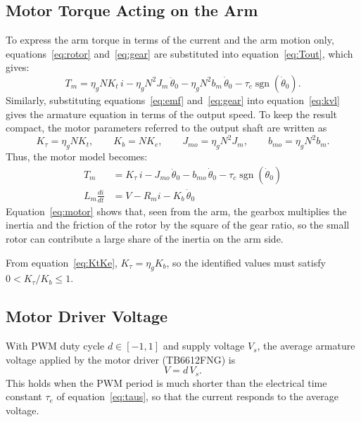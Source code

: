 \documentclass[a4paper,11pt]{article}
\newcommand{\sgn}{\operatorname{sgn}}
\begin{document}
\subsection{Motor Torque Acting on the Arm}
To express the arm torque in terms of the current and the arm motion only, equations~\ref{eq:rotor} and~\ref{eq:gear} are substituted into equation~\ref{eq:Tout}, which gives:
\begin{equation}
  T_m = \eta_g N K_t\, i - \eta_g N^2 J_m\, \ddot\theta_0 - \eta_g N^2 b_m\, \dot\theta_0 - \tau_c \sgn(\dot\theta_0) .
\end{equation}
Similarly, substituting equations~\ref{eq:emf} and~\ref{eq:gear} into equation~\ref{eq:kvl} gives the armature equation in terms of the output speed. To keep the result compact, the motor parameters referred to the output shaft are written as
\begin{equation}
  K_\tau = \eta_g N K_t, \qquad K_b = N K_e, \qquad J_{mo} = \eta_g N^2 J_m, \qquad b_{mo} = \eta_g N^2 b_m .
  \label{eq:outref}
\end{equation}
Thus, the motor model becomes:
\begin{equation}
\boxed{
\begin{aligned}
  T_m &= K_\tau\, i - J_{mo}\, \ddot\theta_0 - b_{mo}\, \dot\theta_0 - \tau_c \sgn(\dot\theta_0)\\
  L_m \frac{di}{dt} &= V - R_m i - K_b\, \dot\theta_0
\end{aligned}
}
\label{eq:motor}
\end{equation}
Equation~\ref{eq:motor} shows that, seen from the arm, the gearbox multiplies the inertia and the friction of the rotor by the square of the gear ratio, so the small rotor can contribute a large share of the inertia on the arm side.

From equation~\ref{eq:KtKe}, $K_\tau = \eta_g K_b$, so the identified values must satisfy $0 < K_\tau / K_b \le 1$.

\subsection{Motor Driver Voltage}
With PWM duty cycle $d \in [-1, 1]$ and supply voltage $V_s$, the average armature voltage applied by the motor driver (TB6612FNG) is
\begin{equation}
  V = d\, V_s .
  \label{eq:duty}
\end{equation}
This holds when the PWM period is much shorter than the electrical time constant $\tau_e$ of equation~\ref{eq:taus}, so that the current responds to the average voltage.
\end{document}
